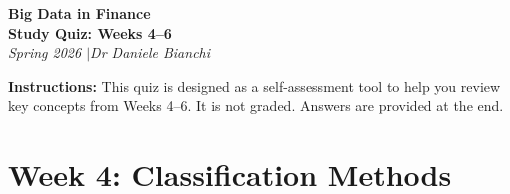 \documentclass[11pt]{article}
\begin{document}
\begin{center}
  {\LARGE\bfseries\color{ThemeBlue} Big Data in Finance}\\[0.5em]
  {\Large\bfseries Study Quiz: Weeks 4--6}\\[0.3em]
  {\large\itshape Spring 2026 \quad$\mid$\quad Dr Daniele Bianchi}
\end{center}

\vspace{1em}

\noindent\textbf{Instructions:} This quiz is designed as a self-assessment tool to help you review key concepts from Weeks 4--6. It is not graded. Answers are provided at the end.

\vspace{1.5em}

\section*{Week 4: Classification Methods}
\end{document}
